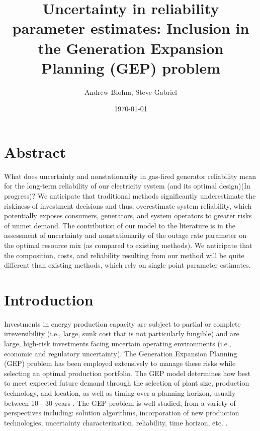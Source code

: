 \documentclass[10pt]{amsart}
\title{Uncertainty in reliability parameter estimates: Inclusion in the Generation Expansion Planning (GEP) problem}
\author{Andrew Blohm, Steve Gabriel}
\date{\today}
\begin{document}
\maketitle

\section{Abstract}
What does uncertainty and nonstationarity in gas-fired generator reliability mean for the long-term reliability of our electricity system (and its optimal design)(In progress)? 
We anticipate that traditional methods significantly underestimate the riskiness of investment decisions and thus, overestimate system reliability, which potentially exposes consumers, generators, and system operators to greater risks of unmet demand. 
The contribution of our model to the literature is in the assessment of uncertainty and nonstationarity of the outage rate parameter on the optimal resource mix (as compared to existing methods). 
We anticipate that the composition, costs, and reliability resulting from our method will be quite different than existing methods, which rely on single point parameter estimates. 

\section{Introduction}
Investments in energy production capacity are subject to partial or complete irreversibility (i.e., large, sunk cost that is not particularly fungible) and are large, high-risk investments facing uncertain operating environments (i.e., economic and regulatory uncertainty)\parencite{bakirtzis:2012aa}. 
The Generation Expansion Planning (GEP) problem has been employed extensively to manage these risks while selecting an optimal production portfolio. 
The GEP model determines how best to meet expected future demand through the selection of plant size, production technology, and location, as well as timing over a planning horizon, usually between 10 - 30 years \parencite{hemmati:2013ab}. 
The GEP problem is well studied, from a variety of perspectives including: solution algorithms, incorporation of new production technologies, uncertainty characterization, reliability, time horizon, etc. \parencite{hemmati:2013ab}.
\end{document}
